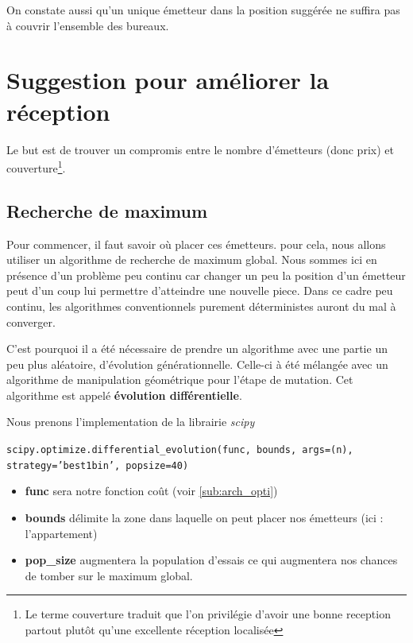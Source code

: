 \documentclass[sn-mathphys-num]{sn-jnl}
\begin{document}
On constate aussi qu'un unique émetteur dans la position suggérée ne suffira pas à couvrir l'ensemble des bureaux.

\section{Suggestion pour améliorer la réception}

Le but est de trouver un compromis entre le nombre d'émetteurs (donc prix) et couverture\footnote{Le terme couverture traduit que l'on privilégie d'avoir une bonne reception partout plutôt qu'une excellente réception localisée}.

\subsection{Recherche de maximum}
Pour commencer, il faut savoir où placer ces émetteurs. pour cela,
nous allons utiliser un algorithme de recherche de maximum global.
Nous sommes ici en présence d'un problème peu continu car changer un peu 
la position d'un émetteur
peut d'un coup lui permettre d'atteindre une nouvelle piece.
Dans ce cadre peu continu, les algorithmes conventionnels purement déterministes
auront du mal à converger.

C'est pourquoi il a été nécessaire de prendre un algorithme avec une partie un peu
plus aléatoire, d'évolution générationnelle. Celle-ci à été mélangée
avec un algorithme de manipulation géométrique pour l'étape de mutation. Cet algorithme
est appelé \textbf{évolution différentielle}.


Nous prenons l'implementation de la librairie \textit{scipy}

\texttt{scipy.optimize.differential\_evolution(func, bounds, args=(n), strategy='best1bin', popsize=40)}
\begin{itemize}
    \item \textbf{func} sera notre fonction coût (voir \ref{sub:arch_opti})
    \item \textbf{bounds} délimite la zone dans laquelle on peut placer nos émetteurs (ici : l'appartement) 
    \item \textbf{pop\_size} augmentera la population d'essais ce qui augmentera nos chances de tomber sur le maximum global.

\end{itemize}
\end{document}
